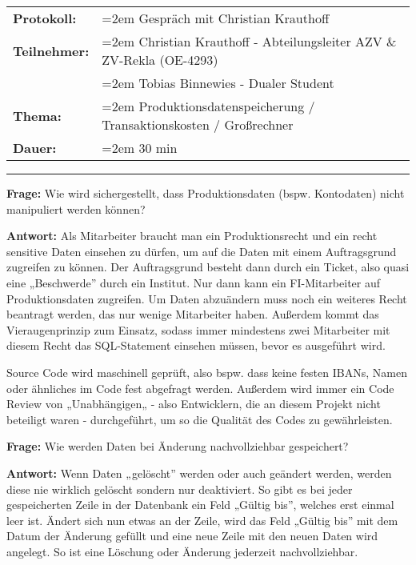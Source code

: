 
\label{appendix: Anhang 3}

\begin{tabular}{p{2.5 cm}>{\raggedright\arraybackslash\hangindent=2em}p{11.8 cm}}
    \textbf{Protokoll:} & Gespräch mit Christian Krauthoff \\
    \textbf{Teilnehmer:} & Christian Krauthoff - Abteilungsleiter AZV \break \& ZV-Rekla (OE-4293) \\
    & Tobias Binnewies - Dualer Student \\
    \textbf{Thema:} & Produktionsdatenspeicherung / Transaktionskosten / Großrechner \\
    \textbf{Dauer:} & 30 min
    \end{tabular}
    

\bigbreak
\noindent\rule[1ex]{\textwidth}{1pt} %
\bigbreak

\textbf{Frage:} 
\label{i1:f1}
Wie wird sichergestellt, dass Produktionsdaten (bspw. Kontodaten) nicht manipuliert werden können?


\textbf{Antwort:} 
Als Mitarbeiter braucht man ein Produktionsrecht und ein recht sensitive Daten einsehen zu dürfen, um auf die Daten mit einem Auftragsgrund zugreifen zu können. Der Auftragsgrund besteht dann durch ein Ticket, also quasi eine „Beschwerde” durch ein Institut.
Nur dann kann ein FI-Mitarbeiter auf Produktionsdaten zugreifen.
Um Daten abzuändern muss noch ein weiteres Recht beantragt werden, das nur wenige Mitarbeiter haben.
Außerdem kommt das Vieraugenprinzip zum Einsatz, sodass immer mindestens zwei Mitarbeiter mit diesem Recht das SQL-Statement einsehen müssen, bevor es ausgeführt wird.

Source Code wird maschinell geprüft, also bspw. dass keine festen IBANs, Namen oder ähnliches im Code fest abgefragt werden.
Außerdem wird immer ein Code Review von „Unabhängigen„ - also Entwicklern, die an diesem Projekt nicht beteiligt waren - durchgeführt, um so die Qualität des Codes zu gewährleisten.

\bigbreak
\bigbreak

\textbf{Frage:}
\label{i1:f2}
Wie werden Daten bei Änderung nachvollziehbar gespeichert?


\textbf{Antwort:}
Wenn Daten „gelöscht” werden oder auch geändert werden, werden diese nie wirklich gelöscht sondern nur deaktiviert.
So gibt es bei jeder gespeicherten Zeile in der Datenbank ein Feld „Gültig bis”, welches erst einmal leer ist. 
Ändert sich nun etwas an der Zeile, wird das Feld „Gültig bis” mit dem Datum der Änderung gefüllt und eine neue Zeile mit den neuen Daten wird angelegt.
So ist eine Löschung oder Änderung jederzeit nachvollziehbar.

